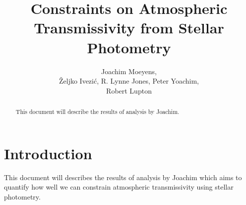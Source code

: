 \documentclass[12pt,preprint]{aastex}
\begin{document}
\title{Constraints on Atmospheric Transmissivity from Stellar Photometry}

\author{
Joachim Moeyens, \\  
{\v Z}eljko Ivezi{\'c},  R. Lynne Jones, Peter Yoachim, \\
Robert Lupton \\
}


\begin{abstract}
This document will describe the results of analysis by Joachim. 
\end{abstract}


\section{Introduction}

This document will describes the results of analysis by Joachim which aims
to quantify how well we can constrain atmospheric transmissivity using stellar photometry. 
\end{document}
